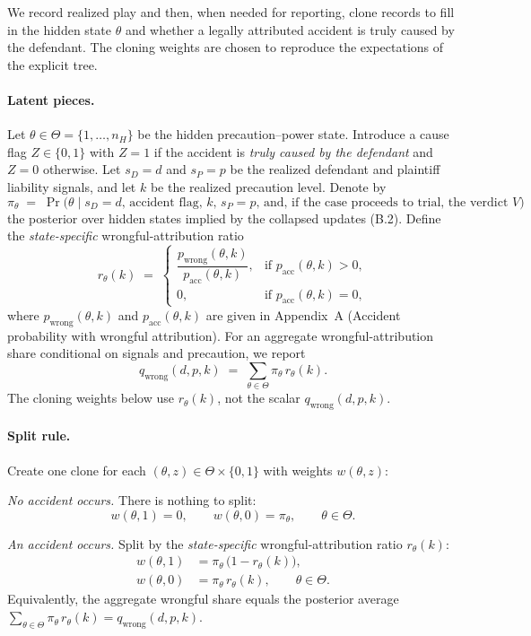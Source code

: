 \documentclass{article}
\begin{document}
We record realized play and then, when needed for reporting, clone records to fill in the hidden state $\theta$ and whether a legally attributed accident is truly caused by the defendant. The cloning weights are chosen to reproduce the expectations of the explicit tree.

\paragraph{Latent pieces.}
Let $\theta\in\Theta=\{1,\dots,n_H\}$ be the hidden precaution--power state. Introduce a cause flag $Z\in\{0,1\}$ with $Z=1$ if the accident is \emph{truly caused by the defendant} and $Z=0$ otherwise. Let $s_D=d$ and $s_P=p$ be the realized defendant and plaintiff liability signals, and let $k$ be the realized precaution level. Denote by
\[
\pi_\theta \;=\; \Pr\!\bigl(\theta \mid s_D=d,\,\text{accident flag},\,k,\,s_P=p,\,\text{and, if the case proceeds to trial, the verdict }V\bigr)
\]
the posterior over hidden states implied by the collapsed updates (B.2). Define the \emph{state-specific} wrongful-attribution ratio
\[
r_\theta(k)\;=\;
\begin{cases}
\dfrac{p_{\mathrm{wrong}}(\theta,k)}{p_{\mathrm{acc}}(\theta,k)}, & \text{if } p_{\mathrm{acc}}(\theta,k) > 0,\\[1.2ex]
0, & \text{if } p_{\mathrm{acc}}(\theta,k) = 0,
\end{cases}
\]
where $p_{\mathrm{wrong}}(\theta,k)$ and $p_{\mathrm{acc}}(\theta,k)$ are given in Appendix~A (Accident probability with wrongful attribution). For an aggregate wrongful-attribution share conditional on signals and precaution, we report
\[
q_{\mathrm{wrong}}(d,p,k)\;=\;\sum_{\theta\in\Theta}\pi_\theta\,r_\theta(k).
\]
The cloning weights below use $r_\theta(k)$, not the scalar $q_{\mathrm{wrong}}(d,p,k)$.

\paragraph{Split rule.}
Create one clone for each $(\theta,z)\in\Theta\times\{0,1\}$ with weights $w(\theta,z)$:

\emph{No accident occurs.} There is nothing to split:
\[
w(\theta,1)=0,\qquad w(\theta,0)=\pi_\theta,\qquad \theta\in\Theta.
\]

\emph{An accident occurs.} Split by the \emph{state-specific} wrongful-attribution ratio $r_\theta(k)$:
\begin{align*}
w(\theta,1) &= \pi_\theta\,\bigl(1 - r_\theta(k)\bigr),\\
w(\theta,0) &= \pi_\theta\, r_\theta(k), \qquad \theta\in\Theta.
\end{align*}
Equivalently, the aggregate wrongful share equals the posterior average $\sum_{\theta\in\Theta}\pi_\theta\,r_\theta(k)=q_{\mathrm{wrong}}(d,p,k)$.
\end{document}
